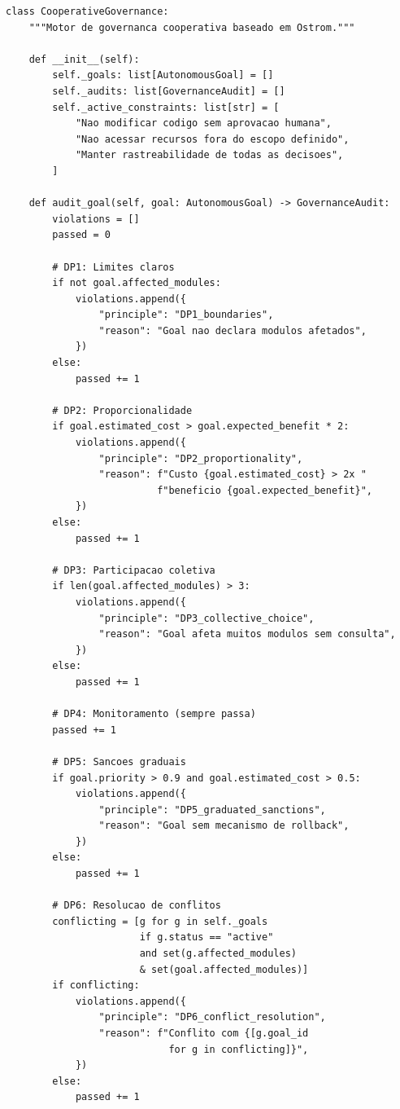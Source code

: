 \begin{lstlisting}[style=pythonstyle, caption={CooperativeGovernance: auditoria Ostrom (cooperative\_governance.py:129-273)}]
class CooperativeGovernance:
    """Motor de governanca cooperativa baseado em Ostrom."""

    def __init__(self):
        self._goals: list[AutonomousGoal] = []
        self._audits: list[GovernanceAudit] = []
        self._active_constraints: list[str] = [
            "Nao modificar codigo sem aprovacao humana",
            "Nao acessar recursos fora do escopo definido",
            "Manter rastreabilidade de todas as decisoes",
        ]

    def audit_goal(self, goal: AutonomousGoal) -> GovernanceAudit:
        violations = []
        passed = 0

        # DP1: Limites claros
        if not goal.affected_modules:
            violations.append({
                "principle": "DP1_boundaries",
                "reason": "Goal nao declara modulos afetados",
            })
        else:
            passed += 1

        # DP2: Proporcionalidade
        if goal.estimated_cost > goal.expected_benefit * 2:
            violations.append({
                "principle": "DP2_proportionality",
                "reason": f"Custo {goal.estimated_cost} > 2x "
                          f"beneficio {goal.expected_benefit}",
            })
        else:
            passed += 1

        # DP3: Participacao coletiva
        if len(goal.affected_modules) > 3:
            violations.append({
                "principle": "DP3_collective_choice",
                "reason": "Goal afeta muitos modulos sem consulta",
            })
        else:
            passed += 1

        # DP4: Monitoramento (sempre passa)
        passed += 1

        # DP5: Sancoes graduais
        if goal.priority > 0.9 and goal.estimated_cost > 0.5:
            violations.append({
                "principle": "DP5_graduated_sanctions",
                "reason": "Goal sem mecanismo de rollback",
            })
        else:
            passed += 1

        # DP6: Resolucao de conflitos
        conflicting = [g for g in self._goals
                       if g.status == "active"
                       and set(g.affected_modules)
                       & set(goal.affected_modules)]
        if conflicting:
            violations.append({
                "principle": "DP6_conflict_resolution",
                "reason": f"Conflito com {[g.goal_id
                            for g in conflicting]}",
            })
        else:
            passed += 1


\end{lstlisting}

